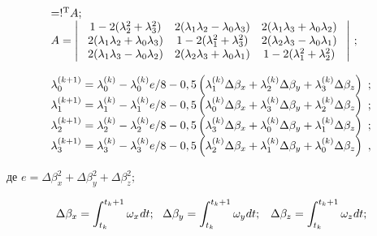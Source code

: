 \begin{equation} \label{eq:__8_19_} \begin{array}{l} {=!^{{\rm T}} A;} \\ {A=
\left|\, \, \begin{array}{ccc} {1-2(\lambda_{2}^{2} +\lambda_{3}^{2} )} & {2(\lambda 
_{1} \lambda_{2} -\lambda_{0} \lambda_{3} )} & {2(\lambda_{1} \lambda_{3} +
\lambda_{0} \lambda_{2} )} \\ {2(\lambda_{1} \lambda_{2} +\lambda_{0} \lambda 
_{3} )} & {1-2(\lambda_{1}^{2} +\lambda_{3}^{2} )} & {2(\lambda_{2} \lambda_{3} 
-\lambda_{0} \lambda_{1} )} \\ {2(\lambda_{1} \lambda_{3} -\lambda_{0} \lambda 
_{2} )} & {2(\lambda_{2} \lambda_{3} +\lambda_{0} \lambda_{1} )} & {1-2(\lambda 
_{1}^{2} +\lambda_{2}^{2} )} \end{array}\, \, \right|\, ;} \\ {} \\ {\lambda_{0}^{(k+1)} 
=\lambda_{0}^{(k)} -\lambda_{0}^{(k)} {e \mathord{\left/{\vphantom{e 8}}\right.
\kern-\nulldelimiterspace} 8} -0,5\left(\lambda_{1}^{(k)} \Delta \beta_{x} +\lambda 
_{2}^{(k)} \Delta \beta_{y} +\lambda_{3}^{(k)} \Delta \beta_{z} \right)\, \, ;} 
\\ {\lambda_{1}^{(k+1)} =\lambda_{1}^{(k)} -\lambda_{1}^{(k)} {e \mathord{\left/{
\vphantom{e 8}}\right.\kern-\nulldelimiterspace} 8} -0,5\left(\lambda_{0}^{(k)} 
\Delta \beta_{x} +\lambda_{3}^{(k)} \Delta \beta_{y} +\lambda_{2}^{(k)} \Delta 
\beta_{z} \right)\, \, ;} \\ {\lambda_{2}^{(k+1)} =\lambda_{2}^{(k)} -\lambda 
_{2}^{(k)} {e \mathord{\left/{\vphantom{e 8}}\right.\kern-\nulldelimiterspace} 8} 
-0,5\left(\lambda_{3}^{(k)} \Delta \beta_{x} +\lambda_{0}^{(k)} \Delta \beta_{y} 
+\lambda_{1}^{(k)} \Delta \beta_{z} \right)\, \, ;} \\ {\lambda_{3}^{(k+1)} =
\lambda_{3}^{(k)} -\lambda_{3}^{(k)} {e \mathord{\left/{\vphantom{e 8}}\right.
\kern-\nulldelimiterspace} 8} -0,5\left(\lambda_{2}^{(k)} \Delta \beta_{x} +\lambda 
_{1}^{(k)} \Delta \beta_{y} +\lambda_{0}^{(k)} \Delta \beta_{z} \right)\, \, ,} 
\end{array} \end{equation} 

 де   $e=\Delta \beta_{x}^{2} +\Delta \beta_{y}^{2} +\Delta \beta_{z}^{2} ;$

\[\Delta \beta_{x} =\int_{t_{k} }^{t_{k} +1}\omega_{x_{{\rm }} } dt ;\, \, \, 
\, \Delta \beta_{y} =\int_{t_{k} }^{t_{k} +1}\omega_{y_{{\rm }} } dt ;\, \, \, 
\, \, \Delta \beta_{z} =\int_{t_{k} }^{t_{k} +1}\omega_{z_{{\rm }} } dt ;\] 

